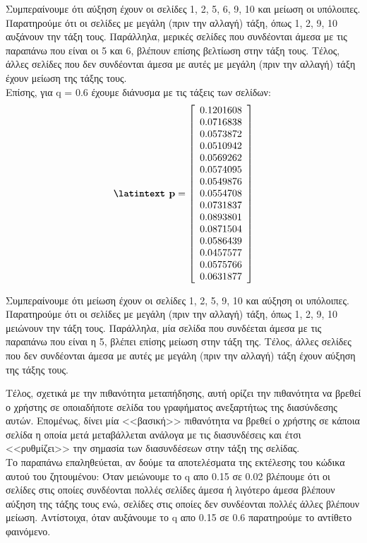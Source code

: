 \documentclass[a4paper,11pt]{article}
\newcommand{\lt}{\latintext}
\begin{document}
Συμπεραίνουμε ότι αύξηση έχουν οι σελίδες 1, 2, 5, 6, 9, 10 και μείωση οι υπόλοιπες.\\
Παρατηρούμε ότι οι σελίδες με μεγάλη (πριν την αλλαγή) τάξη, όπως 1, 2, 9, 10 αυξάνουν την τάξη τους. Παράλληλα, μερικές σελίδες που συνδέονται άμεσα με τις παραπάνω που είναι οι 5 και 6, βλέπουν επίσης βελτίωση στην τάξη τους. Τέλος, άλλες σελίδες που δεν συνδέονται άμεσα με αυτές με μεγάλη (πριν την αλλαγή) τάξη έχουν μείωση της τάξης τους.\\

Επίσης, για {\lt q = 0.6} έχουμε διάνυσμα με τις τάξεις των σελίδων:\\
\[\textbf{{\lt p}}=
    \left[ \begin{array}{c}
    0.1201608 \\
    0.0716838 \\
    0.0573872 \\
    0.0510942 \\
    0.0569262 \\
    0.0574095 \\
    0.0549876 \\
    0.0554708 \\
    0.0731837 \\
    0.0893801 \\
    0.0871504 \\
    0.0586439 \\
    0.0457577 \\
    0.0575766 \\
    0.0631877 \\
    \end{array} \right]
\]

Συμπεραίνουμε ότι μείωση έχουν οι σελίδες 1, 2, 5, 9, 10 και αύξηση οι υπόλοιπες.\\
Παρατηρούμε ότι οι σελίδες με μεγάλη (πριν την αλλαγή) τάξη, όπως 1, 2, 9, 10 μειώνουν την τάξη τους. Παράλληλα, μία σελίδα που συνδέεται άμεσα με τις παραπάνω που είναι η 5, βλέπει επίσης μείωση στην τάξη της. Τέλος, άλλες σελίδες που δεν συνδέονται άμεσα με αυτές με μεγάλη (πριν την αλλαγή) τάξη έχουν αύξηση της τάξης τους.\\

\par
Τέλος, σχετικά με την πιθανότητα μεταπήδησης, αυτή ορίζει την πιθανότητα να βρεθεί ο χρήστης σε οποιαδήποτε σελίδα του γραφήματος ανεξαρτήτως της διασύνδεσης αυτών. Επομένως, δίνει μία <<βασική>> πιθανότητα να βρεθεί ο χρήστης σε κάποια σελίδα η οποία μετά μεταβάλλεται ανάλογα με τις διασυνδέσεις και έτσι <<ρυθμίζει>> την σημασία των διασυνδέσεων στην τάξη της σελίδας.\\
Το παραπάνω επαληθεύεται, αν δούμε τα αποτελέσματα της εκτέλεσης του κώδικα αυτού του ζητουμένου: Όταν μειώνουμε το {\lt q} απο 0.15 σε 0.02 βλέπουμε ότι οι σελίδες στις οποίες συνδέονται πολλές σελίδες άμεσα ή λιγότερο άμεσα βλέπουν αύξηση της τάξης τους ενώ, σελίδες στις οποίες δεν συνδέονται πολλές άλλες βλέπουν μείωση. Αντίστοιχα, όταν αυξάνουμε το {\lt q} απο 0.15 σε 0.6 παρατηρούμε το αντίθετο φαινόμενο.
\end{document}
